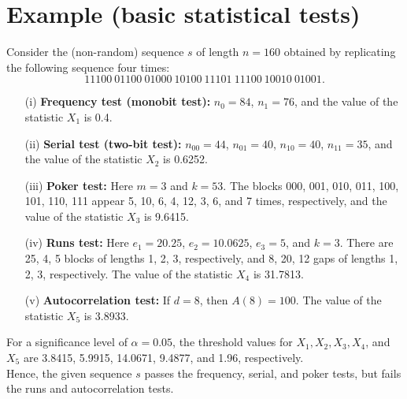 \documentclass[12pt,openany]{book}
\theoremstyle{definition}
\begin{document}
\section*{Example (basic statistical tests)}
Consider the (non-random) sequence \( s \) of length \( n = 160 \) obtained by replicating the following sequence four times:
\[ 11100\ 01100\ 01000\ 10100\ 11101\ 11100\ 10010\ 01001. \]

\begin{enumerate}
	\item[(i)] \textbf{Frequency test (monobit test):} \( n_0 = 84 \), \( n_1 = 76 \), and the value of the statistic \( X_1 \) is 0.4.
	\item[(ii)] \textbf{Serial test (two-bit test):} \( n_{00} = 44 \), \( n_{01} = 40 \), \( n_{10} = 40 \), \( n_{11} = 35 \), and the value of the statistic \( X_2 \) is 0.6252.
	\item[(iii)] \textbf{Poker test:} Here \( m = 3 \) and \( k = 53 \). The blocks 000, 001, 010, 011, 100, 101, 110, 111 appear 5, 10, 6, 4, 12, 3, 6, and 7 times, respectively, and the value of the statistic \( X_3 \) is 9.6415.
	\item[(iv)] \textbf{Runs test:} Here \( e_1 = 20.25 \), \( e_2 = 10.0625 \), \( e_3 = 5 \), and \( k = 3 \). There are 25, 4, 5 blocks of lengths 1, 2, 3, respectively, and 8, 20, 12 gaps of lengths 1, 2, 3, respectively. The value of the statistic \( X_4 \) is 31.7813.
	\item[(v)] \textbf{Autocorrelation test:} If \( d = 8 \), then \( A(8) = 100 \). The value of the statistic \( X_5 \) is 3.8933.
\end{enumerate}

For a significance level of \( \alpha = 0.05 \), the threshold values for \( X_1, X_2, X_3, X_4 \), and \( X_5 \) are 3.8415, 5.9915, 14.0671, 9.4877, and 1.96, respectively. \\
Hence, the given sequence \( s \) passes the frequency, serial, and poker tests, but fails the runs and autocorrelation tests.

\end{document}
